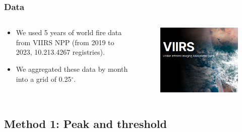 \documentclass[aspectratio=169]{beamer}
\begin{document}
\begin{frame}
    \frametitle{Data}
    \begin{columns}
        \begin{column}{0.5\linewidth}
            \begin{itemize}
                \item We used 5 years of world fire data from VIIRS NPP (from
                    2019 to 2023, 10.213.4267 registries).
                \item We aggregated these data by month into a grid of 0.25$^{\circ}$.
            \end{itemize}
        \end{column}
        \begin{column}{0.5\linewidth}
            \begin{figure}
                \includegraphics[width=0.9\linewidth]{./logos/viirs.png}
            \end{figure}
        \end{column}
    \end{columns}
\end{frame}

\subsection{Method 1: Peak and threshold}
\end{document}

